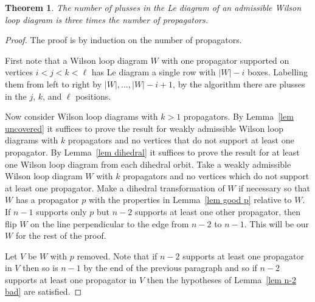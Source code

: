\documentclass[11pt]{article}
\newtheorem{thm}{Theorem}[section]
\theoremstyle{remark}
\theoremstyle{definition}
\begin{document}
\begin{thm}
  The number of plusses in the Le diagram of an admissible Wilson loop diagram is three times the number of propagators.
\end{thm}

\begin{proof}
  The proof is by induction on the number of propagators.

  First note that a Wilson loop diagram $W$ with one propagator supported on vertices $i<j<k<\ell$ has Le diagram a single row with $|W|-i$ boxes.  Labelling them from left to right by $|W|, \ldots, |W|-i+1$, by the algorithm there are plusses in the $j$, $k$, and $\ell$ positions.

  Now consider Wilson loop diagrams with $k>1$ propagators.  By Lemma~\ref{lem uncovered} it suffices to prove the result for weakly admissible Wilson loop diagrams with $k$ propagators and no vertices that do not support at least one propagator.  By Lemma~\ref{lem dihedral} it suffices to prove the result for at least one Wilson loop diagram from each dihedral orbit.  Take a weakly admissible Wilson loop diagram $W$ with $k$ propagators and no vertices which do not support at least one propagator.  Make a dihedral transformation of $W$ if necessary so that $W$ has a propagator $p$ with the properties in Lemma~\ref{lem good p} relative to $W$.  If $n-1$ supports only $p$ but $n-2$ supports at least one other propagator, then flip $W$ on the line perpendicular to the edge from $n-2$ to $n-1$.  This will be our $W$ for the rest of the proof.

  Let $V$ be $W$ with $p$ removed.  Note that if $n-2$ supports at least one propagator in $V$ then so is $n-1$ by the end of the previous paragraph and so if $n-2$ supports at least one propagator in $V$ then the hypotheses of Lemma~\ref{lem n-2 bad} are satisfied.


\end{proof}
\end{document}
